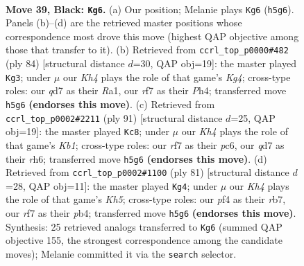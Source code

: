 \documentclass[11pt]{article}
\begin{document}
\clearpage

\begin{figure}[p]\centering
\begin{subfigure}{0.46\textwidth}\centering
\resizebox{\linewidth}{!}{%
\newchessgame
\chessboard[
  setfen={8/2pQ1R2/7p/7k/5P2/6P1/8/R5K1 b - - 0 39},
  showmover=false,
  pgfstyle=straightmove, color=movearrow, markmove={h5-g6}
]}
\caption{}
\end{subfigure}\hfill
\begin{subfigure}{0.46\textwidth}\centering
\resizebox{\linewidth}{!}{%
\newchessgame
\chessboard[
  setfen={8/8/1kp5/8/2PP2KP/8/pr6/R7 w - - 1 43},
  showmover=false,
  pgfstyle=straightmove, color=movearrow, markmove={g4-g3}
]}
\caption{}
\end{subfigure}
\\[4pt]
\begin{subfigure}{0.46\textwidth}\centering
\resizebox{\linewidth}{!}{%
\newchessgame
\chessboard[
  setfen={1k6/p6p/2P4R/8/7K/8/P7/6r1 b - - 0 46},
  showmover=false,
  pgfstyle=straightmove, color=movearrow, markmove={b8-c8}
]}
\caption{}
\end{subfigure}\hfill
\begin{subfigure}{0.46\textwidth}\centering
\resizebox{\linewidth}{!}{%
\newchessgame
\chessboard[
  setfen={8/1R6/p7/P6p/1P5k/r7/4K3/8 b - - 0 41},
  showmover=false,
  pgfstyle=straightmove, color=movearrow, markmove={h4-g4}
]}
\caption{}
\end{subfigure}
\caption{\textbf{Move 39, Black: \texttt{Kg6}.} (a) Our position; Melanie plays \texttt{Kg6} (\texttt{h5g6}). Panels (b)--(d) are the retrieved master positions whose correspondence most drove this move (highest QAP objective among those that transfer to it). (b) Retrieved from \texttt{ccrl\_top\_p0000\#482} (ply 84) [structural distance $d$=30, QAP obj=19]: the master played \texttt{Kg3}; under $\mu$ our \emph{Kh4} plays the role of that game's \emph{Kg4}; cross-type roles: our \emph{q}d7 as their \emph{R}a1, our \emph{r}f7 as their \emph{P}h4; transferred move \texttt{h5g6} \textbf{(endorses this move)}. (c) Retrieved from \texttt{ccrl\_top\_p0002\#2211} (ply 91) [structural distance $d$=25, QAP obj=19]: the master played \texttt{Kc8}; under $\mu$ our \emph{Kh4} plays the role of that game's \emph{Kb1}; cross-type roles: our \emph{r}f7 as their \emph{p}c6, our \emph{q}d7 as their \emph{r}h6; transferred move \texttt{h5g6} \textbf{(endorses this move)}. (d) Retrieved from \texttt{ccrl\_top\_p0002\#1100} (ply 81) [structural distance $d$=28, QAP obj=11]: the master played \texttt{Kg4}; under $\mu$ our \emph{Kh4} plays the role of that game's \emph{Kh5}; cross-type roles: our \emph{p}f4 as their \emph{r}b7, our \emph{r}f7 as their \emph{p}b4; transferred move \texttt{h5g6} \textbf{(endorses this move)}. Synthesis: 25 retrieved analogs transferred to \texttt{Kg6} (summed QAP objective 155, the strongest correspondence among the candidate moves); Melanie committed it via the \texttt{search} selector.}
\label{fig:thought-m77}
\end{figure}
\end{document}
